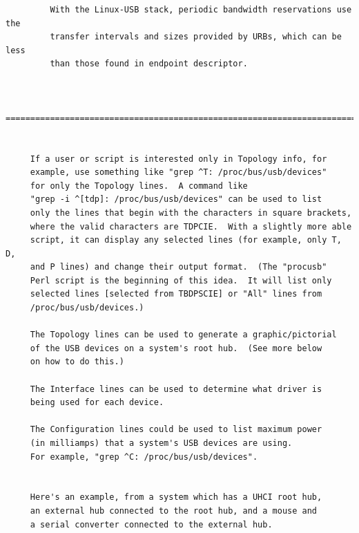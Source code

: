 {{{{{{{{{{{{{{{{{\begin{verbatim}
         With the Linux-USB stack, periodic bandwidth reservations use the
         transfer intervals and sizes provided by URBs, which can be less
         than those found in endpoint descriptor.
     
     
     =======================================================================
     
     
     If a user or script is interested only in Topology info, for
     example, use something like "grep ^T: /proc/bus/usb/devices"
     for only the Topology lines.  A command like
     "grep -i ^[tdp]: /proc/bus/usb/devices" can be used to list
     only the lines that begin with the characters in square brackets,
     where the valid characters are TDPCIE.  With a slightly more able
     script, it can display any selected lines (for example, only T, D,
     and P lines) and change their output format.  (The "procusb"
     Perl script is the beginning of this idea.  It will list only
     selected lines [selected from TBDPSCIE] or "All" lines from
     /proc/bus/usb/devices.)
     
     The Topology lines can be used to generate a graphic/pictorial
     of the USB devices on a system's root hub.  (See more below
     on how to do this.)
     
     The Interface lines can be used to determine what driver is
     being used for each device.
     
     The Configuration lines could be used to list maximum power
     (in milliamps) that a system's USB devices are using.
     For example, "grep ^C: /proc/bus/usb/devices".
     
     
     Here's an example, from a system which has a UHCI root hub,
     an external hub connected to the root hub, and a mouse and
     a serial converter connected to the external hub.
     

\end{verbatim}}}}}}}}}}}}}}}}}}
